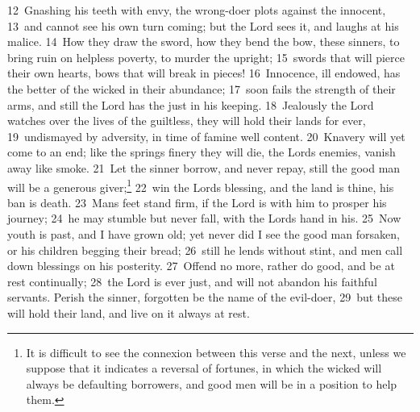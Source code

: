 \documentclass[10pt]{book} %
\begin{document}
\textcolor{benred8}{12}~Gnashing his teeth with envy, the wrong-doer plots against the innocent, \textcolor{benred8}{13}~and cannot see his own turn coming; but the Lord sees it, and laughs at his malice. \textcolor{benred8}{14}~How they draw the sword, how they bend the bow, these sinners, to bring ruin on helpless poverty, to murder the upright; \textcolor{benred8}{15}~swords that will pierce their own hearts, bows that will break in pieces! \textcolor{benred8}{16}~Innocence, ill endowed, has the better of the wicked in their abundance; \textcolor{benred8}{17}~soon fails the strength of their arms, and still the Lord has the just in his keeping. \textcolor{benred8}{18}~Jealously the Lord watches over the lives of the guiltless, they will hold their lands for ever, \textcolor{benred8}{19}~undismayed by adversity, in time of famine well content. \textcolor{benred8}{20}~Knavery will yet come to an end; like the spring\textquotesingle s finery they will die, the Lord\textquotesingle s enemies, vanish away like smoke. \textcolor{benred8}{21}~Let the sinner borrow, and never repay, still the good man will be a generous giver;\footnote[1]{It is difficult to see the connexion between this verse and the next, unless we suppose that it indicates a reversal of fortunes, in which the wicked will always be defaulting borrowers, and good men will be in a position to help them.} \textcolor{benred8}{22}~win the Lord\textquotesingle s blessing, and the land is thine, his ban is death. \textcolor{benred8}{23}~Man\textquotesingle s feet stand firm, if the Lord is with him to prosper his journey; \textcolor{benred8}{24}~he may stumble but never fall, with the Lord\textquotesingle s hand in his. \textcolor{benred8}{25}~Now youth is past, and I have grown old; yet never did I see the good man forsaken, or his children begging their bread; \textcolor{benred8}{26}~still he lends without stint, and men call down blessings on his posterity. \textcolor{benred8}{27}~Offend no more, rather do good, and be at rest continually; \textcolor{benred8}{28}~the Lord is ever just, and will not abandon his faithful servants. Perish the sinner, forgotten be the name of the evil-doer, \textcolor{benred8}{29}~but these will hold their land, and live on it always at rest.
\end{document}

